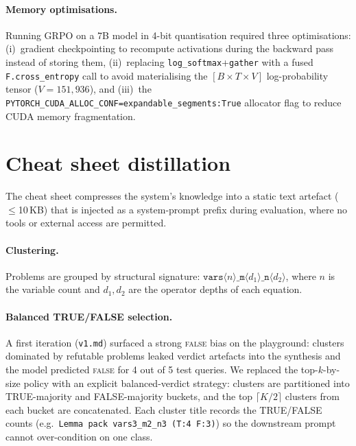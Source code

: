 \documentclass{article}
\begin{document}
\paragraph{Memory optimisations.} Running GRPO on a 7B model in 4-bit quantisation required three optimisations: (i)~gradient checkpointing to recompute activations during the backward pass instead of storing them, (ii)~replacing \texttt{log\_softmax}+\texttt{gather} with a fused \texttt{F.cross\_entropy} call to avoid materialising the $[B \times T \times V]$ log-probability tensor ($V{=}151{,}936$), and (iii)~the \texttt{PYTORCH\_CUDA\_ALLOC\_CONF=expandable\_segments:True} allocator flag to reduce CUDA memory fragmentation.

\section{Cheat sheet distillation}
\label{sec:cheatsheet}

The cheat sheet compresses the system's knowledge into a static text artefact ($\leq$10\,KB) that is injected as a system-prompt prefix during evaluation, where no tools or external access are permitted.

\paragraph{Clustering.} Problems are grouped by structural signature: $\texttt{vars}\langle n \rangle\texttt{\_m}\langle d_1 \rangle\texttt{\_n}\langle d_2 \rangle$, where $n$ is the variable count and $d_1, d_2$ are the operator depths of each equation.

\paragraph{Balanced TRUE/FALSE selection.} A first iteration (\texttt{v1.md}) surfaced a strong \textsc{false} bias on the playground: clusters dominated by refutable problems leaked verdict artefacts into the synthesis and the model predicted \textsc{false} for 4 out of 5 test queries. We replaced the top-$k$-by-size policy with an explicit balanced-verdict strategy: clusters are partitioned into TRUE-majority and FALSE-majority buckets, and the top $\lceil K/2 \rceil$ clusters from each bucket are concatenated. Each cluster title records the TRUE/FALSE counts (e.g.\ \texttt{Lemma pack vars3\_m2\_n3 (T:4 F:3)}) so the downstream prompt cannot over-condition on one class.
\end{document}
